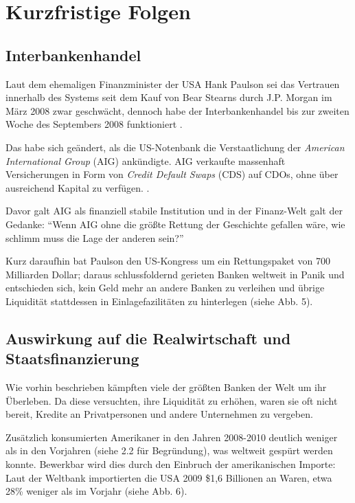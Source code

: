 \documentclass[a4paper,11pt]{report}
\begin{document}
\section{Kurzfristige Folgen}
\subsection{Interbankenhandel}
Laut dem ehemaligen Finanzminister der USA Hank Paulson sei das Vertrauen
innerhalb des Systems seit dem Kauf von Bear Stearns durch J.P. Morgan
im M\"arz 2008 zwar
geschw\"acht, dennoch habe der Interbankenhandel
bis zur zweiten Woche des Septembers 2008 funktioniert \parencite[1:25]{paulsonyt}.

Das habe sich ge\"andert, als die US-Notenbank die Verstaatlichung 
der \textit{American International Group} (AIG) ank\"undigte.
AIG verkaufte massenhaft Versicherungen in Form von 
\textit{Credit Default Swaps} (CDS) auf CDOs, ohne 
\"uber ausreichend Kapital zu verf\"ugen. \parencite[206]{acharyar}.

Davor galt AIG als finanziell stabile Institution und in
der Finanz-Welt galt der Gedanke: \enquote{Wenn AIG ohne die gr\"oßte
Rettung der Geschichte gefallen w\"are, wie schlimm muss
die Lage der anderen sein?} \parencite[5:45]{paulsonyt}

Kurz daraufhin bat Paulson den US-Kongress um ein Rettungspaket von
700 Milliarden Dollar; daraus schlussfoldernd gerieten Banken weltweit
in Panik \parencite{dimonyt}
und entschieden sich, kein Geld mehr an andere Banken zu verleihen
und \"ubrige Liquidit\"at stattdessen 
in Einlagefazilit\"aten zu hinterlegen (siehe Abb. 5).

\subsection{Auswirkung auf die Realwirtschaft und Staatsfinanzierung}
Wie vorhin beschrieben k\"ampften viele der gr\"oßten Banken
der Welt um ihr \"Uberleben. Da diese versuchten,
ihre Liquidit\"at zu erh\"ohen, waren sie oft nicht bereit, Kredite
an Privatpersonen und andere Unternehmen zu vergeben.

Zus\"atzlich konsumierten Amerikaner in den Jahren 2008-2010 deutlich weniger
als in den Vorjahren (siehe 2.2 f\"ur Begr\"undung), was weltweit
gesp\"urt werden konnte. 
Bewerkbar wird dies durch den Einbruch der amerikanischen Importe:
Laut der Weltbank importierten die USA 2009 \$1,6 Billionen an Waren, etwa 28\%
weniger als im Vorjahr (siehe Abb. 6).
\end{document}
